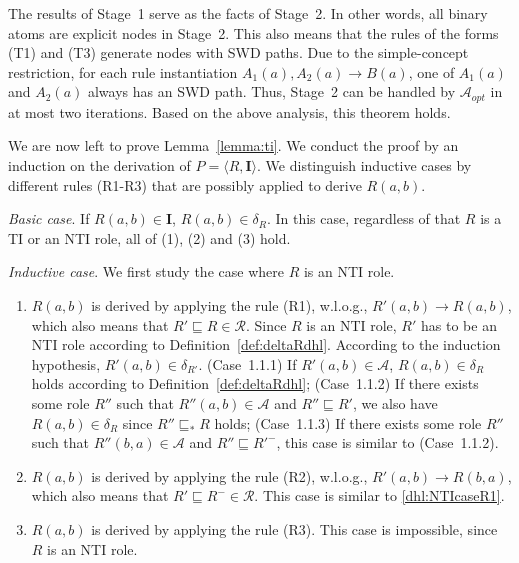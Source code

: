 The results of Stage~1 serve as the facts of Stage~2. In other words, all binary atoms
are explicit nodes in Stage~2. This also means that the rules of the forms (T1) and (T3)
generate nodes with SWD paths. Due to the simple-concept restriction, for each rule
instantiation $A_1(a),A_2(a)\rightarrow B(a)$, one of $A_1(a)$ and $A_2(a)$ always has an SWD path.
Thus, Stage~2 can be handled by $\mathcal{A}_{opt}$ in at most two iterations.
Based on the above analysis, this theorem holds.

We are now left to prove Lemma~\ref{lemma:ti}. We conduct the proof by an induction on
the derivation of $P=\langle R,\textbf{I}\rangle$. We distinguish inductive cases by different rules (R1-R3)
that are possibly applied to derive $R(a,b)$.

\emph{Basic case}. If $R(a,b)\in\textbf{I}$, $R(a,b)\in\delta_{R}$. In this case,
regardless of that $R$ is a TI or an NTI role, all of (1), (2) and (3) hold.

\emph{Inductive case}. We first study the case where $R$ is an NTI role.

\begin{enumerate}[leftmargin=12ex,label=Case~1.\arabic*, ref=Case~1.\arabic*]
\item $R(a,b)$ is derived by applying the rule (R1), w.l.o.g., $R'(a,b)\rightarrow R(a,b)$,
    which also means that $R'\sqsubseteq R\in\mathcal{R}$. Since $R$ is an NTI role, $R'$ has to
    be an NTI role according to Definition~\ref{def:deltaRdhl}. According to the induction hypothesis,
    $R'(a,b)\in\delta_{R'}$. (Case~1.1.1) If $R'(a,b)\in\mathcal{A}$, $R(a,b)\in\delta_{R}$
    holds according to Definition~\ref{def:deltaRdhl}; (Case~1.1.2) If there exists some
    role $R''$ such that $R''(a,b)\in\mathcal{A}$ and $R''\sqsubseteq R'$, we also have
    $R(a,b)\in\delta_{R}$ since $R''\sqsubseteq_* R$ holds; (Case~1.1.3) If there exists some
    role $R''$ such that $R''(b,a)\in\mathcal{A}$ and $R''\sqsubseteq R'^-$, this case is
    similar to (Case~1.1.2).\label{dhl:NTIcaseR1}

\item $R(a,b)$ is derived by applying the rule (R2), w.l.o.g., $R'(a,b)\rightarrow R(b,a)$,
    which also means that $R'\sqsubseteq R^-\in\mathcal{R}$. This case is similar
    to \ref{dhl:NTIcaseR1}.\label{dhl:NTIcaseR2}

\item $R(a,b)$ is derived by applying the rule (R3). This case is impossible, since $R$ is
    an NTI role.
\end{enumerate}


